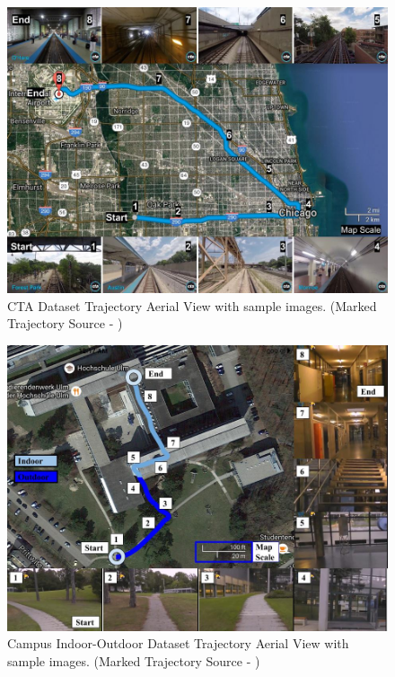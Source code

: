\documentclass[letterpaper, 10 pt, conference]{ieeeconf}  %
\begin{document}
\begin{figure}[h]
\centering
 \includegraphics[scale=0.23]{cta-datasetTrajSampleImages}
 \caption{CTA Dataset Trajectory Aerial View with sample images. (Marked Trajectory Source - \cite{ctaTrajGMap})}
 \label{fig:ctaTraj}
\end{figure}

\begin{figure}[h]
\centering
 \includegraphics[scale=0.23]{campus-datasetTrajSampleImages}
 \caption{Campus Indoor-Outdoor Dataset Trajectory Aerial View with sample images. (Marked Trajectory Source - \cite{ctaTrajGMap})}
 \label{fig:campusTraj}
\end{figure}
\end{document}
